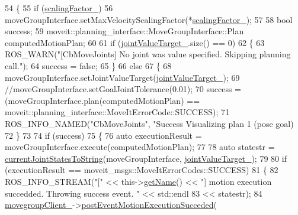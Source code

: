 \begin{DoxyCode}
54   \{
55     \textcolor{keywordflow}{if} (\hyperlink{classcl__move__group__interface_1_1CbMoveJoints_a2480db16c4bf55a40701c00cd2afe9a0}{scalingFactor\_})
56       moveGroupInterface.setMaxVelocityScalingFactor(*\hyperlink{classcl__move__group__interface_1_1CbMoveJoints_a2480db16c4bf55a40701c00cd2afe9a0}{scalingFactor\_});
57 
58     \textcolor{keywordtype}{bool} success;
59     moveit::planning\_interface::MoveGroupInterface::Plan computedMotionPlan;
60 
61     \textcolor{keywordflow}{if} (\hyperlink{classcl__move__group__interface_1_1CbMoveJoints_a8103f7c923a34d9bf5a2c374ff88a277}{jointValueTarget\_}.size() == 0)
62     \{
63       ROS\_WARN(\textcolor{stringliteral}{"[CbMoveJoints] No joint was value specified. Skipping planning call."});
64       success = \textcolor{keyword}{false};
65     \}
66     \textcolor{keywordflow}{else}
67     \{
68       moveGroupInterface.setJointValueTarget(\hyperlink{classcl__move__group__interface_1_1CbMoveJoints_a8103f7c923a34d9bf5a2c374ff88a277}{jointValueTarget\_});
69       \textcolor{comment}{//moveGroupInterface.setGoalJointTolerance(0.01);}
70       success = (moveGroupInterface.plan(computedMotionPlan) == 
      moveit::planning\_interface::MoveItErrorCode::SUCCESS);
71       ROS\_INFO\_NAMED(\textcolor{stringliteral}{"CbMoveJoints"}, \textcolor{stringliteral}{"Success Visualizing plan 1 (pose goal) %
72     \}
73 
74     \textcolor{keywordflow}{if} (success)
75     \{
76       \textcolor{keyword}{auto} executionResult = moveGroupInterface.execute(computedMotionPlan);
77 
78       \textcolor{keyword}{auto} statestr = \hyperlink{namespacecl__move__group__interface_aad71400738b3e25d9fa9ac924670de5d}{currentJointStatesToString}(moveGroupInterface, 
      \hyperlink{classcl__move__group__interface_1_1CbMoveJoints_a8103f7c923a34d9bf5a2c374ff88a277}{jointValueTarget\_});
79       
80       \textcolor{keywordflow}{if} (executionResult == moveit\_msgs::MoveItErrorCodes::SUCCESS)
81       \{
82         ROS\_INFO\_STREAM(\textcolor{stringliteral}{"["} << this->\hyperlink{classsmacc_1_1ISmaccClientBehavior_a18e4bec9460b010f2894c0f7e7064a34}{getName}() << \textcolor{stringliteral}{"] motion execution succedded. Throwing success
       event. "} << std::endl
83                                                                                               << statestr);
84         \hyperlink{classcl__move__group__interface_1_1CbMoveJoints_aa5749bbc6bb5f09069e9e8115326f024}{movegroupClient\_}->\hyperlink{classcl__move__group__interface_1_1ClMoveGroup_aebaf269db373d41837bae87651458e54}{postEventMotionExecutionSucceded}(
}
\end{DoxyCode}
